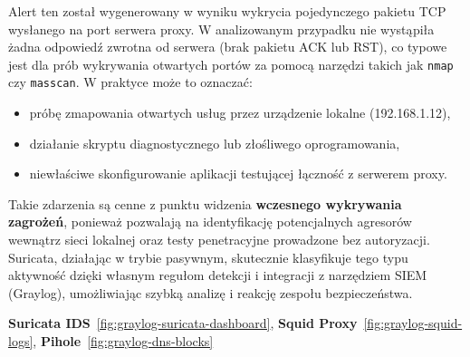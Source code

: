 \documentclass[
    left=2.5cm,         %
    right=2.5cm,        %
    top=2.5cm,          %
    bottom=3cm,         %
    bindingoffset=6mm,  %
    nohyphenation=true %
]{eiti/eiti-thesis} %
\begin{document}
Alert ten został wygenerowany w wyniku wykrycia pojedynczego pakietu TCP wysłanego na port serwera proxy. W analizowanym przypadku nie wystąpiła żadna odpowiedź zwrotna od serwera (brak pakietu ACK lub RST), co typowe jest dla prób wykrywania otwartych portów za pomocą narzędzi takich jak \texttt{nmap} czy \texttt{masscan}. W praktyce może to oznaczać:
\begin{itemize}
\item próbę zmapowania otwartych usług przez urządzenie lokalne (192.168.1.12),
\item działanie skryptu diagnostycznego lub złośliwego oprogramowania,
\item niewłaściwe skonfigurowanie aplikacji testującej łączność z serwerem proxy.
\end{itemize}

Takie zdarzenia są cenne z punktu widzenia \textbf{wczesnego wykrywania zagrożeń}, ponieważ pozwalają na identyfikację potencjalnych agresorów wewnątrz sieci lokalnej oraz testy penetracyjne prowadzone bez autoryzacji. Suricata, działając w trybie pasywnym, skutecznie klasyfikuje tego typu aktywność dzięki własnym regułom detekcji i integracji z narzędziem SIEM (Graylog), umożliwiając szybką analizę i reakcję zespołu bezpieczeństwa.

\textbf{Suricata IDS}~\ref{fig:graylog-suricata-dashboard}, \textbf{Squid Proxy}~\ref{fig:graylog-squid-logs}, \textbf{Pihole}~\ref{fig:graylog-dns-blocks}
\end{document}
